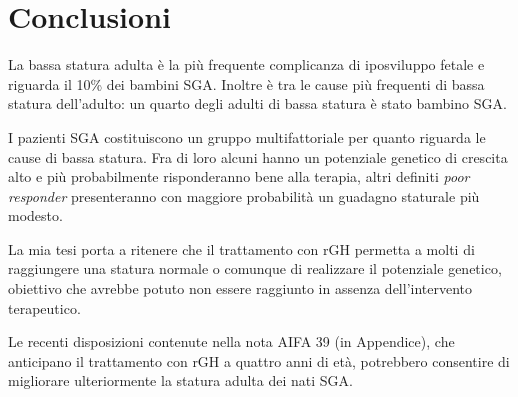 \chapter{Conclusioni}

La bassa statura adulta è la più frequente complicanza  di iposviluppo fetale e riguarda il 10\% dei bambini SGA.
Inoltre è tra le cause più frequenti di bassa statura dell'adulto: un quarto degli adulti di bassa statura è stato bambino SGA. 

I pazienti SGA costituiscono un gruppo multifattoriale per quanto riguarda le cause di bassa statura. Fra di loro alcuni hanno un potenziale genetico di crescita alto e più probabilmente risponderanno bene alla terapia, altri definiti \textit{poor responder} presenteranno con maggiore probabilità un guadagno staturale più modesto.

La mia tesi porta a ritenere che il trattamento con rGH permetta a molti di raggiungere una statura normale o comunque di realizzare il potenziale genetico, obiettivo che avrebbe potuto non essere raggiunto in assenza dell'intervento terapeutico.

Le recenti disposizioni contenute nella nota AIFA 39 (in Appendice), che anticipano il trattamento con rGH  a quattro anni di età, potrebbero consentire di migliorare ulteriormente la statura adulta dei nati SGA.
  